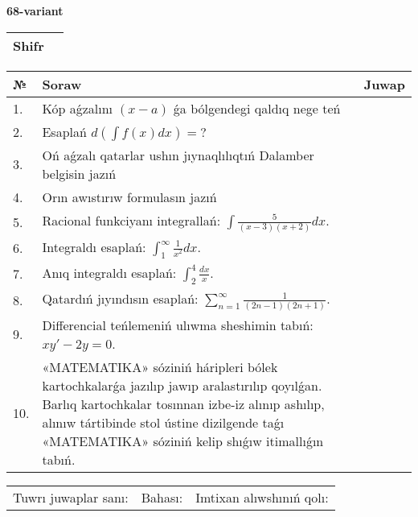 \documentclass{article}
\begin{document}
  \egroup
  
  \newpage
  
  
  \textbf{68-variant}\\
  
  \bgroup
  \def\arraystretch{1.6} %
  
  \begin{tabular}{|m{5.7cm}|m{9.5cm}|}
  \hline
  Shifr & \\
  \hline
  \end{tabular}
  
  \vspace{1cm}
  
  \begin{tabular}{|m{0.7cm}|m{10cm}|m{4cm}|}
  \hline
  № & Soraw & Juwap \\
  \hline
  1. & Kóp aǵzalını \((x - a)\) ǵa bólgendegi qaldıq nege teń &  \\
  \hline
  2. & Esaplań \(d\left( \int{f(x)dx} \right) = ?\) &  \\
  \hline
  3. & Oń aǵzalı qatarlar ushın jıynaqlılıqtıń Dalamber belgisin jazıń &  \\
  \hline
  4. & Orın awıstırıw formulasın jazıń &  \\
  \hline
  5. & Racional funkciyanı integrallań: \(\int{\frac{5}{(x - 3)(x + 2)}dx}\). &  \\
  \hline
  6. & Integraldı esaplań: \(\int_{1}^{\infty}{\frac{1}{x^2 }dx}\). &  \\
  \hline
  7. & Anıq integraldı esaplań: \(\int_{2}^{4}\frac{dx}{x}\). &  \\
  \hline
  8. & Qatardıń jıyındısın esaplań: \(\sum_{n = 1}^{\infty}\frac{1}{(2n - 1)(2n + 1)}\). &  \\
  \hline
  9. & Differencial teńlemeniń ulıwma sheshimin tabıń: \(xy' - 2y = 0\). &  \\
  \hline
  10. & «MATEMATIKA» sóziniń háripleri bólek kartochkalarǵa jazılıp jawıp aralastırılıp qoyılǵan. Barlıq kartochkalar tosınnan izbe-iz alınıp ashılıp, alınıw tártibinde stol ústine dizilgende taǵı «MATEMATIKA» sóziniń kelip shıǵıw itimallıǵın tabıń. &  \\
  \hline
  \end{tabular}
  
  \vspace{1cm}
  
  \begin{tabular}{lll}
  Tuwrı juwaplar sanı: \underline{\hspace{1.5cm}} & 
  Bahası: \underline{\hspace{1.5cm}} & 
  Imtixan alıwshınıń qolı: \underline{\hspace{2cm}} \\
  \end{tabular}
  
\end{document}
